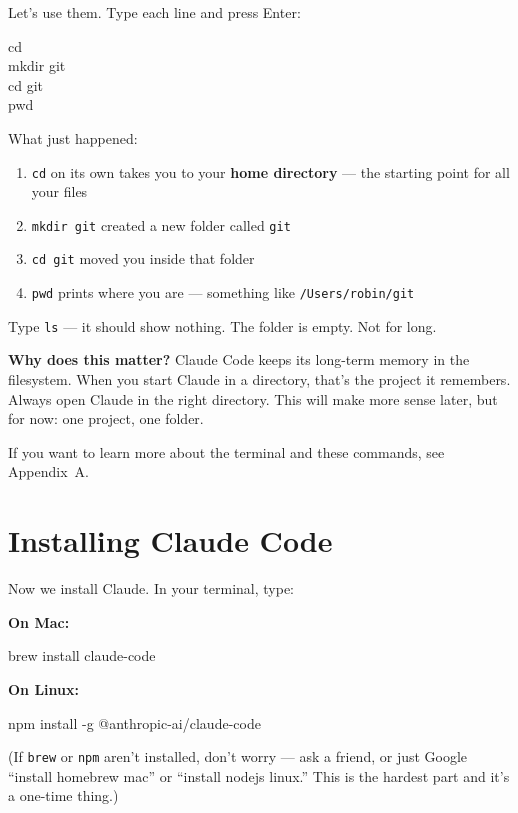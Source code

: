 \documentclass[11pt,a4paper]{article}
\begin{document}
Let's use them. Type each line and press Enter:

\begin{tcolorbox}[termbox]
cd\\
mkdir git\\
cd git\\
pwd
\end{tcolorbox}

What just happened:

\begin{enumerate}[leftmargin=1.5em]
  \item \texttt{cd} on its own takes you to your \textbf{home directory} --- the starting point for all your files
  \item \texttt{mkdir git} created a new folder called \texttt{git}
  \item \texttt{cd git} moved you inside that folder
  \item \texttt{pwd} prints where you are --- something like \texttt{/Users/robin/git}
\end{enumerate}

Type \texttt{ls} --- it should show nothing. The folder is empty. Not for long.

\textbf{Why does this matter?} Claude Code keeps its long-term memory in the filesystem. When you start Claude in a directory, that's the project it remembers. Always open Claude in the right directory. This will make more sense later, but for now: one project, one folder.

If you want to learn more about the terminal and these commands, see Appendix~A.

\section{Installing Claude Code}

Now we install Claude. In your terminal, type:

\textbf{On Mac:}
\begin{tcolorbox}[termbox]
brew install claude-code
\end{tcolorbox}

\textbf{On Linux:}
\begin{tcolorbox}[termbox]
npm install -g @anthropic-ai/claude-code
\end{tcolorbox}

(If \texttt{brew} or \texttt{npm} aren't installed, don't worry --- ask a friend, or just Google ``install homebrew mac'' or ``install nodejs linux.'' This is the hardest part and it's a one-time thing.)
\end{document}
